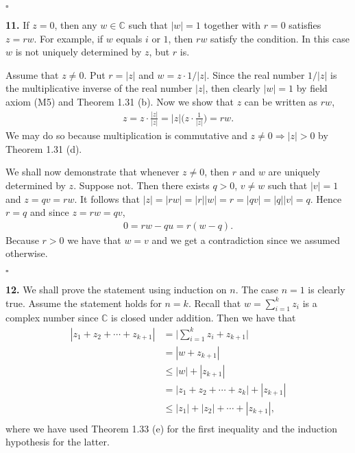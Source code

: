\documentclass[11pt]{article}
\begin{document}
\hfill$\square$

\noindent\textbf{11.} If $z = 0$, then any $w \in \mathbb{C}$ such that $|w| = 1$ together with $r=0$ satisfies $z = rw$.
For example, if $w$ equals $i$ or $1$, then $rw$ satisfy the condition.
In this case $w$ is not uniquely determined by $z$, but $r$ is.

Assume that $z \neq 0$.
Put $r = |z|$ and $w = z\cdot 1/|z|$.
Since the real number $1/|z|$ is the multiplicative inverse of the real number $|z|$, then clearly $|w| = 1$ by field axiom (M5) and Theorem 1.31 (b).
Now we show that $z$ can be written as $rw$,
\begin{align*}
  z = z \cdot\frac{|z|}{|z|} = |z| \Biggl( z\cdot\frac{1}{|z|} \Biggr) = rw.
\end{align*}
We may do so because multiplication is commutative and $z\neq 0 \Rightarrow |z| > 0$ by Theorem 1.31 (d).

We shall now demonstrate that whenever $z\neq 0$, then $r$ and $w$ are uniquely determined by $z$.
Suppose not.
Then there exists $q > 0$, $v\neq w$ such that $|v| = 1$ and $z = qv = rw$.
It follows that $|z| = |rw| = |r||w| = r = |qv| = |q||v| = q$.
Hence $r = q$ and since $z = rw = qv$,
\begin{align*}
  0 = rw - qu = r ( w - q ).
\end{align*}
Because $r > 0$ we have that $w = v$ and we get a contradiction since we assumed otherwise.

\hfill$\square$


\noindent\textbf{12.} We shall prove the statement using induction on $n$.
The case $n=1$ is clearly true.
Assume the statement holds for $n=k$.
Recall that $w = \sum_{i=1}^k z_i$ is a complex number since $\mathbb{C}$ is closed under addition.
Then we have that
\begin{align*}
  | z_1 + z_2 + \cdots + z_{k+1} | &= \Bigg| \sum_{i=1}^k z_i + z_{k+1} \Bigg| \\
                                   &= | w + z_{k+1} | \\
                                   &\leq | w | + | z_{k+1} | \\
                                   &= | z_1 + z_2 + \cdots + z_k | + | z_{k+1} |\\
                                   &\leq | z_1 | + | z_2 | + \cdots + | z_{k+1} |, \\
\end{align*}
where we have used Theorem 1.33 (e) for the first inequality and the induction hypothesis for the latter.
\end{document}
